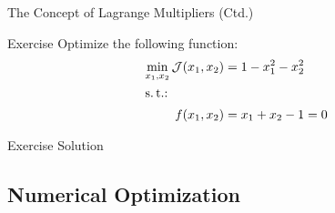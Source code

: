 \begin{frame}{The Concept of Lagrange Multipliers (Ctd.)}{}\important
\end{frame}


\begin{frame}{Exercise}{}
	Optimize the following function:
	\begin{align*}
		\min_{x_1, x_2} \mathcal{J}(x_1, x_2)
			&= 1 - x_1^2 - x_2^2 		\\
		\intertext{s.\,t.:}
		f(x_1, x_2)
			&= x_1 + x_2 - 1 = 0
		\end{align*}
\end{frame}


\begin{frame}{Exercise Solution}{}
	
\end{frame}


\subsection{Numerical Optimization}

